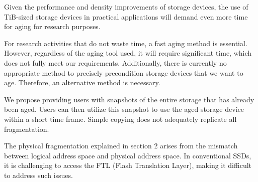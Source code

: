 Given the performance and density improvements of storage devices, the use of TiB-sized storage devices in practical applications will demand even more time for aging for research purposes.




For research activities that do not waste time, a fast aging method is essential.
However, regardless of the aging tool used, it will require significant time, which does not fully meet our requirements.
Additionally, there is currently no appropriate method to precisely precondition storage devices that we want to age.
Therefore, an alternative method is necessary.

We propose providing users with snapshots of the entire storage that has already been aged.
Users can then utilize this snapshot to use the aged storage device within a short time frame.
Simple copying does not adequately replicate all fragmentation.

The physical fragmentation explained in section 2 arises from the mismatch between logical address space and physical address space.
In conventional SSDs, it is challenging to access the FTL (Flash Translation Layer), making it difficult to address such issues.

